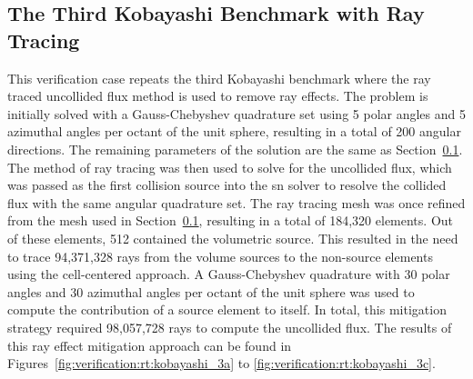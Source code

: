 \subsection{The Third Kobayashi Benchmark with Ray Tracing}
\label{verification:radiation_transport_rt:kobayashi}

This verification case repeats the third Kobayashi benchmark where the ray traced uncollided flux method is used to remove ray effects. The problem is initially solved with a Gauss-Chebyshev quadrature set using 5 polar angles and 5 azimuthal angles per octant of the unit sphere, resulting in a total of 200 angular directions. The remaining parameters of the solution are the same as Section~\ref{verification:radiation_transport_rt:kobayashi}. The method of ray tracing was then used to solve for the uncollided flux, which was passed as the first collision source into the \acrshort{sn} solver to resolve the collided flux with the same angular quadrature set. The ray tracing mesh was once refined from the mesh used in Section~\ref{verification:radiation_transport_rt:kobayashi}, resulting in a total of 184,320 elements. Out of these elements, 512 contained the volumetric source. This resulted in the need to trace 94,371,328 rays from the volume sources to the non-source elements using the cell-centered approach. A Gauss-Chebyshev quadrature with 30 polar angles and 30 azimuthal angles per octant of the unit sphere was used to compute the contribution of a source element to itself. In total, this mitigation strategy required 98,057,728 rays to compute the uncollided flux. The results of this ray effect mitigation approach can be found in Figures~\ref{fig:verification:rt:kobayashi_3a} to \ref{fig:verification:rt:kobayashi_3c}.

